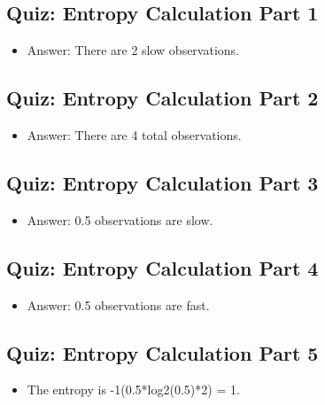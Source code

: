 \documentclass[12pt]{report}
\begin{document}
\subsection{Quiz: Entropy Calculation Part 1}

\begin{itemize}

\item Answer: There are 2 slow observations. 

\end{itemize}

\subsection{Quiz: Entropy Calculation Part 2}

\begin{itemize}

\item Answer: There are 4 total observations. 

\end{itemize}

\subsection{Quiz: Entropy Calculation Part 3}

\begin{itemize}

\item Answer: 0.5 observations are slow. 

\end{itemize}

\subsection{Quiz: Entropy Calculation Part 4}

\begin{itemize}

\item Answer: 0.5 observations are fast. 

\end{itemize}

\subsection{Quiz: Entropy Calculation Part 5}

\begin{itemize}

\item The entropy is -1(0.5*log2(0.5)*2) = 1. 

\end{itemize}
\end{document}
